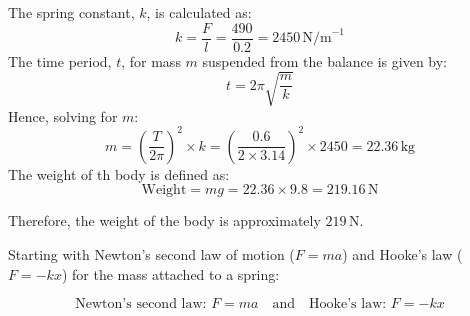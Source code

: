 \documentclass[journal,12pt,twocolumn]{IEEEtran}
\theoremstyle{remark}
\begin{document}



The spring constant, \( k \), is calculated as:
\begin{equation}
k = \frac{F}{l} = \frac{490}{0.2} = 2450 \, \text{N/m}^{-1}
\end{equation}
The time period, \( t \), for mass \( m \) suspended from the balance is given by:
\begin{equation}
t = 2\pi\sqrt{\frac{m}{k}}
\end{equation}
Hence, solving for \( m \):
\begin{equation}
m = \left(\frac{T}{2\pi}\right)^2 \times k = \left(\frac{0.6}{2 \times 3.14}\right)^2 \times 2450 = 22.36 \, \text{kg}
\end{equation}
The weight of th body is defined as:
\begin{equation}
\text{Weight} = mg = 22.36 \times 9.8 = 219.16 \, \text{N}
\end{equation}

Therefore, the weight of the body is approximately \(219 \, \text{N}\).
	
	\vspace{2cm}

	Starting with Newton's second law of motion ($F = ma$) and Hooke's law ($F = -kx$) for the mass attached to a spring:

\begin{equation}
    \text{Newton's second law: } F = ma \quad \text{and} \quad \text{Hooke's law: } F = -kx
\end{equation}
\end{document}
